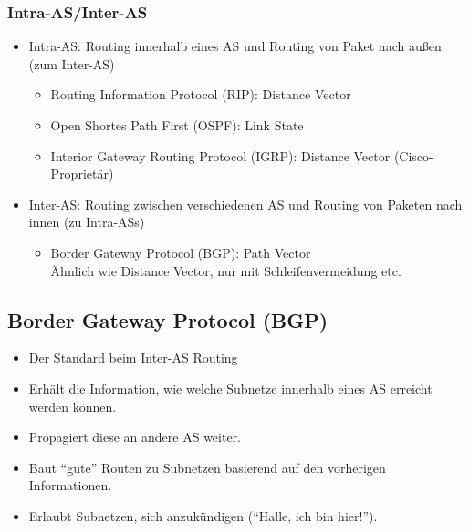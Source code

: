             \subsubsection{Intra-AS/Inter-AS}
                \begin{itemize}
                	\item Intra-AS: Routing innerhalb eines AS und Routing von Paket nach außen (zum Inter-AS)
                    	\begin{itemize}
                    		\item Routing Information Protocol (RIP): Distance Vector
                    		\item Open Shortes Path First (OSPF): Link State
                    		\item Interior Gateway Routing Protocol (IGRP): Distance Vector (Cisco-Proprietär)
                    	\end{itemize}
                	\item Inter-AS: Routing zwischen verschiedenen AS und Routing von Paketen nach innen (zu Intra-ASs)
                    	\begin{itemize}
                    		\item Border Gateway Protocol (BGP): Path Vector \\ Ähnlich wie Distance Vector, nur mit Schleifenvermeidung etc.
                    	\end{itemize}
                \end{itemize}

        \subsection{Border Gateway Protocol (BGP)}
            \begin{itemize}
            	\item Der Standard beim Inter-AS Routing
            	\item Erhält die Information, wie welche Subnetze innerhalb eines AS erreicht werden können.
            	\item Propagiert diese an andere AS weiter.
            	\item Baut \enquote{gute} Routen zu Subnetzen basierend auf den vorherigen Informationen.
            	\item Erlaubt Subnetzen, sich anzukündigen (\enquote{Halle, ich bin hier!}).
            \end{itemize}
            
